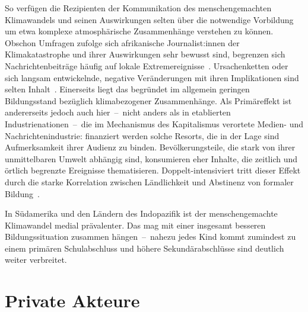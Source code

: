 So verfügen die Rezipienten der Kommunikation des menschengemachten Klimawandels und seinen Auswirkungen selten über die notwendige Vorbildung um etwa komplexe atmosphärische Zusammenhänge verstehen zu können.
Obschon Umfragen zufolge sich afrikanische Journalist:innen der Klimakatastrophe und ihrer Auswirkungen sehr bewusst sind, begrenzen sich Nachrichtenbeiträge häufig auf lokale Extremereignisse~\cite{TechReport.Lidubwi.ClimateJournalisminEastAfricaInAnEraOfMisinformation.2023}. %
Ursachenketten oder sich langsam entwickelnde, negative Veränderungen mit ihren Implikationen sind selten Inhalt~\cite{Booklet.Guedegbe.MEDIAPERCEPTIONSOFCLIMATECHANGEINSUBSAHARANAFRICA.2023}.%
Einerseits liegt das begründet im allgemein geringen Bildungsstand bezüglich klimabezogener Zusammenhänge.
Als Primäreffekt ist andererseits jedoch auch hier~--~nicht anders als in etablierten Industrienationen~--~die im Mechanismus des Kapitalismus verortete Medien- und Nachrichtenindustrie:
finanziert werden solche Resorts, die in der Lage sind Aufmerksamkeit ihrer Audienz zu binden.
Bevölkerungsteile, die stark von ihrer unmittelbaren Umwelt abhängig sind, konsumieren eher Inhalte, die zeitlich und örtlich begrenzte Ereignisse thematisieren.
Doppelt-intensiviert tritt dieser Effekt durch die starke Korrelation zwischen Ländlichkeit und Abstinenz von formaler Bildung~\cite{Article..GlobalEducationMonitoringReport.}.\par\medskip

In Südamerika und den Ländern des Indopazifik ist der menschengemachte Klimawandel medial prävalenter.
Das mag mit einer insgesamt besseren Bildungssituation zusammen hängen~--~nahezu jedes Kind kommt zumindest zu einem primären Schulabschluss und höhere Sekundärabschlüsse sind deutlich weiter verbreitet.


\section{Private Akteure}